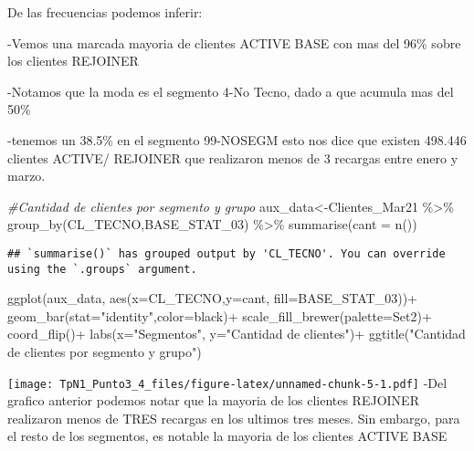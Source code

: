 \documentclass[
]{article}
\newenvironment{Shaded}{\begin{snugshade}}{\end{snugshade}}
\newcommand{\AttributeTok}[1]{\textcolor[rgb]{0.77,0.63,0.00}{#1}}
\newcommand{\CommentTok}[1]{\textcolor[rgb]{0.56,0.35,0.01}{\textit{#1}}}
\newcommand{\FunctionTok}[1]{\textcolor[rgb]{0.00,0.00,0.00}{#1}}
\newcommand{\NormalTok}[1]{#1}
\newcommand{\OtherTok}[1]{\textcolor[rgb]{0.56,0.35,0.01}{#1}}
\newcommand{\SpecialCharTok}[1]{\textcolor[rgb]{0.00,0.00,0.00}{#1}}
\newcommand{\StringTok}[1]{\textcolor[rgb]{0.31,0.60,0.02}{#1}}
\begin{document}
De las frecuencias podemos inferir:

-Vemos una marcada mayoria de clientes ACTIVE BASE con mas del 96\%
sobre los clientes REJOINER

-Notamos que la moda es el segmento 4-No Tecno, dado a que acumula mas
del 50\%

-tenemos un 38.5\% en el segmento 99-NOSEGM esto nos dice que existen
498.446 clientes ACTIVE/ REJOINER que realizaron menos de 3 recargas
entre enero y marzo.

\begin{Shaded}
\begin{Highlighting}[]
\CommentTok{\#Cantidad de clientes por segmento y grupo}
\NormalTok{aux\_data}\OtherTok{\textless{}{-}}\NormalTok{Clientes\_Mar21 }\SpecialCharTok{\%\textgreater{}\%} \FunctionTok{group\_by}\NormalTok{(CL\_TECNO,BASE\_STAT\_03) }\SpecialCharTok{\%\textgreater{}\%}
          \FunctionTok{summarise}\NormalTok{(}\AttributeTok{cant =} \FunctionTok{n}\NormalTok{())}
\end{Highlighting}
\end{Shaded}

\begin{verbatim}
## `summarise()` has grouped output by 'CL_TECNO'. You can override using the `.groups` argument.
\end{verbatim}

\begin{Shaded}
\begin{Highlighting}[]
\FunctionTok{ggplot}\NormalTok{(aux\_data, }\FunctionTok{aes}\NormalTok{(}\AttributeTok{x=}\NormalTok{CL\_TECNO,}\AttributeTok{y=}\NormalTok{cant, }\AttributeTok{fill=}\NormalTok{BASE\_STAT\_03))}\SpecialCharTok{+}
  \FunctionTok{geom\_bar}\NormalTok{(}\AttributeTok{stat=}\StringTok{"identity"}\NormalTok{,}\AttributeTok{color=}\StringTok{\textquotesingle{}black\textquotesingle{}}\NormalTok{)}\SpecialCharTok{+}
  \FunctionTok{scale\_fill\_brewer}\NormalTok{(}\AttributeTok{palette=}\StringTok{\textquotesingle{}Set2\textquotesingle{}}\NormalTok{)}\SpecialCharTok{+}
  \FunctionTok{coord\_flip}\NormalTok{()}\SpecialCharTok{+}
  \FunctionTok{labs}\NormalTok{(}\AttributeTok{x=}\StringTok{"Segmentos"}\NormalTok{,  }\AttributeTok{y=}\StringTok{"Cantidad de clientes"}\NormalTok{)}\SpecialCharTok{+}
  \FunctionTok{ggtitle}\NormalTok{(}\StringTok{"Cantidad de clientes por segmento y grupo"}\NormalTok{)}
\end{Highlighting}
\end{Shaded}

\texttt{[image: TpN1\_Punto3\_4\_files/figure-latex/unnamed-chunk-5-1.pdf]}
-Del grafico anterior podemos notar que la mayoria de los clientes
REJOINER realizaron menos de TRES recargas en los ultimos tres meses.
Sin embargo, para el resto de los segmentos, es notable la mayoria de
los clientes ACTIVE BASE
\end{document}
